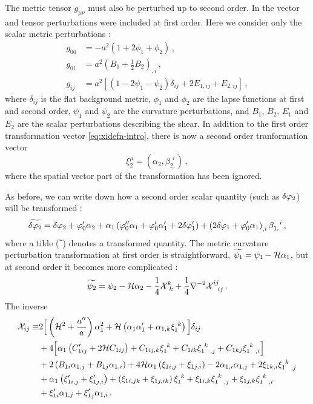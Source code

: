 The metric tensor $g_{\mu\nu}$ must also be perturbed up to second order. In
 the vector and tensor perturbations were included at first
order. Here we consider only the scalar metric perturbations \cite{Malik:2008im}:
%
\begin{align}
\label{eq:metric1-num}
%
g_{00}&= -a^2\left(1+2\phi_1+\phi_2\right) \,, \nonumber\\
%
g_{0i}&= a^2\left(B_1+\frac{1}{2}B_2\right)_{,i}\,, \nonumber\\
%
g_{ij}&= a^2\left[\left(1-2\psi_1-\psi_2\right)\delta_{ij}
+2E_{1,ij}+E_{2,ij}\right]\,,
\end{align}
%
where $\delta_{ij}$ is the flat background metric, $\phi_1$ and $\phi_2$ are the
lapse functions at first and second order, $\psi_1$ and $\psi_2$ are the curvature
perturbations, and $B_1$, $B_2$, $E_1$ and $E_2$ are the
scalar perturbations describing the shear.
% 
In addition to the first order transformation vector \eqref{eq:xidefn-intro}, there
is
now a second order tranformation vector
% 
\begin{equation}
 \label{eq:xi2defn-perts}
\xi_2^\mu = (\alpha_2, \beta_{2,}^{~~i}) \,,
\end{equation}
% 
where the spatial vector part of the transformation has been ignored. 

As before, we
can write down how a second order scalar quantity (such as $\delta\varphi_{2}$) will be
transformed \cite{Malik:2005cy}:
% 
\begin{equation}
\label{eq:dvp2transform-perts}
 \widetilde{\delta\varphi_{2}} = \delta\varphi_{2} + \varphi_0'\alpha_2 + \alpha_1\left(\varphi_0'' \alpha_1 + \varphi_0'
\alpha_1' + 2\delta\varphi_{1}'\right) + \left(2\delta\varphi_{1} + \varphi_0'\alpha_1\right)_{,i}
\beta_{1,}^{~~i} \,,
\end{equation}
% 
where a tilde ($\widetilde{~}$) denotes a transformed quantity. 
The metric curvature perturbation transformation at first order is straightforward,
$\widetilde{\psi_1} = \psi_1 -\mathcal{H} \alpha_1$, but at second order it becomes more complicated
\cite{Malik:2008im}:
% 
\begin{equation}
 \label{eq:psi2transform-perts}
\widetilde{\psi_2} = \psi_2 -\mathcal{H}\alpha_2 -\frac{1}{4}\mathcal{X}^k_{~k} +
 \frac{1}{4}\nabla^{-2} \mathcal{X}^{ij}_{~~ij}\,.
\end{equation}
% 
The inverse
\begin{align}
 \label{Xijdef}
\mathcal{X}_{ij} \equiv 
&2\Big[\left(\H^2+\frac{a''}{a}\right)\alpha_1^2
+\H\left(\alpha_1\alpha_1'+\alpha_{1,k}\xi_{1}^{~k}
\right)\Big] \delta_{ij}\nonumber\\
%
&
+4\Big[\alpha_1\left(C_{1ij}'+2\H C_{1ij}\right)
+C_{1ij,k}\xi_{1}^{~k}+C_{1ik}\xi_{1~~,j}^{~k}
+C_{1kj}\xi_{1~~,i}^{~k}\Big] \nonumber\\
% 
&+2\left(B_{1i}\alpha_{1,j}+B_{1j}\alpha_{1,i}\right)
+4\H\alpha_1\left( \xi_{1i,j}+\xi_{1j,i}\right)
-2\alpha_{1,i}\alpha_{1,j}+2\xi_{1k,i}\xi_{1~~,j}^{~k} \nonumber \\
% 
&+\alpha_1\left( \xi_{1i,j}'+\xi_{1j,i}' \right)
+\left(\xi_{1i,jk}+\xi_{1j,ik}\right)\xi_{1}^{~k}
+\xi_{1i,k}\xi_{1~~,j}^{~k}+\xi_{1j,k}\xi_{1~~,i}^{~k} \nonumber \\
% 
&+\xi_{1i}'\alpha_{1,j}+\xi_{1j}'\alpha_{1,i}
\,.
\end{align}

